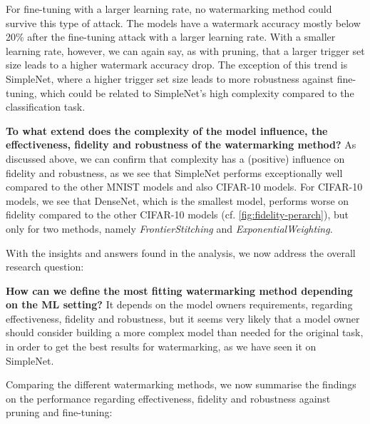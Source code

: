 For fine-tuning with a larger learning rate, no watermarking method could survive this type of attack. The models have a watermark accuracy mostly below 20\% after the fine-tuning attack with a larger learning rate. With a smaller learning rate, however, we can again say, as with pruning, that a larger trigger set size leads to a higher watermark accuracy drop. The exception of this trend is SimpleNet, where a higher trigger set size leads to more robustness against fine-tuning, which could be related to SimpleNet's high complexity compared to the classification task.

\textbf{To what extend does the complexity of the model influence, the effectiveness, fidelity and robustness of the watermarking method?}
As discussed above, we can confirm that complexity has a (positive) influence on fidelity and robustness, as we see that SimpleNet performs exceptionally well compared to the other MNIST models and also CIFAR-10 models. For CIFAR-10 models, we see that DenseNet, which is the smallest model, performs worse on fidelity compared to the other CIFAR-10 models (cf. \cref{fig:fidelity-perarch}), but only for two methods, namely \textit{FrontierStitching} and \textit{ExponentialWeighting}.

With the insights and answers found in the analysis, we now address the overall research question:

\textbf{How can we define the most fitting watermarking method depending on the ML setting?}
It depends on the model owners requirements, regarding effectiveness, fidelity and robustness, but it seems very likely that a model owner should consider building a more complex model than needed for the original task, in order to get the best results for watermarking, as we have seen it on SimpleNet.


Comparing the different watermarking methods, we now summarise the findings on the performance regarding effectiveness, fidelity and robustness against pruning and fine-tuning:

